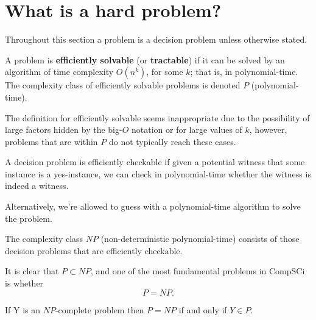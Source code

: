 \chapter{What is a hard problem?}

Throughout this section a problem is a decision problem unless otherwise stated.

\begin{definition}
    A problem is \textbf{efficiently solvable} (or \textbf{tractable}) if it can be solved by an algorithm of time complexity $O(n^k)$, for some $k$; that is, in polynomial-time. The complexity class of efficiently solvable problems is denoted $P$ (polynomial-time).
\end{definition}

\begin{remark}
    The definition for efficiently solvable seems inappropriate due to the possibility of large factors hidden by the big-$O$ notation or for large values of $k$, however, problems that are within $P$ do not typically reach these cases.
\end{remark}

\begin{definition}
    A decision problem is efficiently checkable if given a potential witness that some instance is a yes-instance, we can check in polynomial-time whether the witness is indeed a witness.
    
    Alternatively, we're allowed to guess with a polynomial-time algorithm to solve the problem.
\end{definition}

\begin{definition}
    The complexity class $NP$ (non-deterministic polynomial-time) consists of those decision problems that are efficiently checkable.
\end{definition}

It is clear that $P\subset NP$, and one of the most fundamental problems in CompSCi is whether \[P=NP.\]

\begin{definition}
    If Y is an $NP$-complete problem then $P=NP$ if and only if $Y\in P$.
\end{definition}


